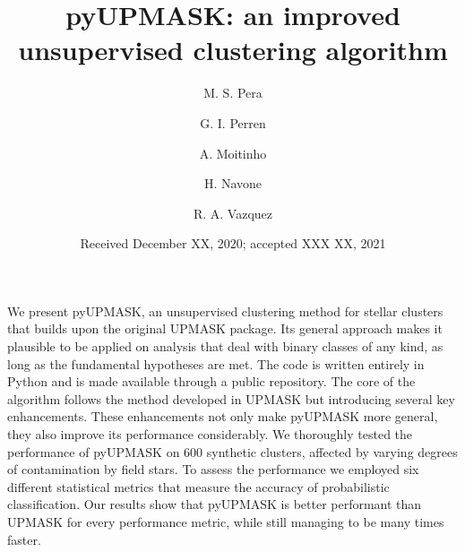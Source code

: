 \documentclass[draft]{aa}
\begin{document}
 


\title{pyUPMASK: an improved unsupervised clustering algorithm}

\author{M. S. Pera
\and
G. I. Perren
\and
A. Moitinho
\and
H. Navone
\and
R. A. Vazquez
}


\date{Received December XX, 2020; accepted XXX XX, 2021}

\abstract
  {}
  {We present pyUPMASK, an unsupervised clustering method for stellar clusters
  that builds upon the original UPMASK package. Its general approach makes it
  plausible to be applied on analysis that deal with binary classes of any kind,
  as long as the fundamental hypotheses are met.
  The code is written entirely in Python and is made available through a public
  repository.}
  {The core of the algorithm follows the method developed in UPMASK but
  introducing several key enhancements. These enhancements not only make
  pyUPMASK more general, they also improve its performance considerably.
  }
  {We thoroughly tested the performance of pyUPMASK on 600 synthetic clusters,
  affected by varying degrees of contamination by field stars. To assess the
  performance we employed six different statistical metrics that measure the
  accuracy of probabilistic classification.}
  {Our results show that pyUPMASK is better performant than UPMASK for every
  performance  metric, while still managing to be many times faster.
  }
\end{document}
